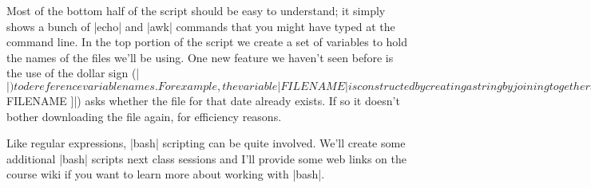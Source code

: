 \documentclass[10pt,letterpaper]{article}
\begin{document}
Most of the bottom half of the script should be easy to understand; it simply shows a bunch of |echo| and |awk| commands that you might have typed at the command line. In the top portion of the script we create a set of variables to hold the names of the files we'll be using. One new feature we haven't seen before is the use of the dollar sign (|$|) to dereference variable names.  For example, the variable |FILENAME| is constructed by creating a string by joining together the strings held in the variables |TODAY| and |BASEFILE| (and separated by a dash |-|). Depending on the date on which the script is run it generates a different set of file names, as specified by the variables |TODAY|, |BASEFILE|, and |REPORT|.  The bottom half of the script is setup to generate the appropriate output given those changing variables. 

One other feature to take note of is the |if-then-fi| conditional statement. The portion in the square brackets (|[ ! -e $FILENAME ]|) asks whether the file for that date already exists. If so it doesn't bother downloading the file again, for efficiency reasons.

Like regular expressions, |bash| scripting can be quite involved. We'll create some additional |bash| scripts next class sessions and I'll provide some web links on the course wiki if you want to learn more about working with |bash|.
\end{document}
